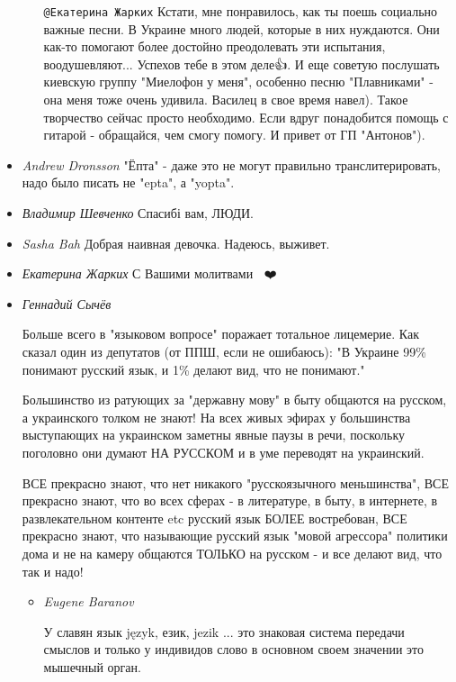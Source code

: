 \begin{itemize}
\begin{itemize}
\verb|@Екатерина Жарких| Кстати, мне понравилось, как ты поешь социально важные
песни. В Украине много людей, которые в них нуждаются. Они как-то помогают
более достойно преодолевать эти испытания, воодушевляют... Успехов тебе в этом
деле👍. И еще советую послушать киевскую группу "Миелофон у меня", особенно
песню "Плавниками" - она меня тоже очень удивила. Василец в свое время навел).
Такое творчество сейчас просто необходимо. Если вдруг понадобится помощь с
гитарой - обращайся, чем смогу помогу. И привет от ГП "Антонов").

\end{itemize}

\item \emph{Andrew Dronsson}
"Ёпта" - даже это не могут правильно транслитерировать, надо было писать не "epta", а "yopta".

\item \emph{Владимир Шевченко}
Спасибі вам, ЛЮДИ.

\item \emph{Sasha Bah}
Добрая наивная девочка. Надеюсь, выживет.

\item \emph{Екатерина Жарких}
С Вашими молитвами 🙏🏻❤️

\item \emph{Геннадий Сычёв}

Больше всего в "языковом вопросе" поражает тотальное лицемерие. Как сказал один
из депутатов (от ППШ, если не ошибаюсь): "В Украине 99\% понимают русский язык,
и 1\%  делают вид, что не понимают."

Большинство из ратующих за "державну мову" в быту общаются на русском, а
украинского толком не знают! На всех живых эфирах у большинства выступающих на
украинском заметны явные паузы в речи, поскольку поголовно они думают НА
РУССКОМ и в уме переводят на украинский. 

ВСЕ прекрасно знают, что нет никакого "русскоязычного меньшинства", ВСЕ
прекрасно знают, что во всех сферах -  в литературе, в быту, в интернете, в
развлекательном контенте etc русский язык БОЛЕЕ востребован, ВСЕ прекрасно
знают, что называющие русский язык "мовой агрессора"  политики дома и не на
камеру общаются ТОЛЬКО на русском - и все делают вид, что так и надо!

\begin{itemize}

\item \emph{Eugene Baranov}

У славян язык język, език, jezik ... это знаковая система передачи  смыслов и
только у индивидов слово в основном своем значении это мышечный орган.


\end{itemize}
\end{itemize}
